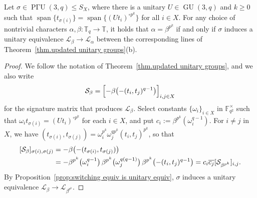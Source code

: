 \begin{lemma}
\label{lem: unitary equiv}
Let $\sigma \in \operatorname{P\text{$\Gamma$}U}(3,q) \leq S_X$, where there is a unitary $U \in \operatorname{GU}(3,q)$ and $k \geq 0$ such that $\operatorname{span}\{t_{\sigma(i)} \} = \operatorname{span}\{(Ut_i)^{\circ p^k}\}$ for all $i \in X$.
For any choice of nontrivial characters $\alpha,\beta \colon \mathbb{T}_q \to \mathbb{T}$, it holds that $\alpha = \beta^{p^k}$ if and only if $\sigma$ induces a unitary equivalence $\mathscr{L}_\beta \to \mathscr{L}_\alpha$ between the corresponding lines of Theorem~\ref{thm.updated unitary groups}(b).
\end{lemma}

\begin{proof}
We follow the notation of Theorem~\ref{thm.updated unitary groups}, and we also write 
\[
\mathcal{S}_\beta = \Bigl[ - \beta\bigl(-(t_i,t_j)^{q-1} \bigr) \Bigr]_{i,j \in X}
\] 
for the signature matrix that produces $\mathscr{L}_\beta$.
Select constants $\{ \omega_i \}_{i\in X}$ in $\mathbb{F}_{q^2}^\times$ such that $\omega_i t_{\sigma(i)} = (U t_i)^{\circ p^k}$ for each $i \in X$, and put $c_i := \beta^{p^k}(\omega_i^{q-1})$.
For $i\neq j$ in $X$, we have $(t_{\sigma(i)}, t_{\sigma(j)}) = \omega_i^{p^k} \omega_j^{q p^k} (t_i, t_j)^{p^k}$, so that
\begin{align}
\label{eq: unitary equiv 1}
[\mathcal{S}_\beta]_{\sigma(i), \sigma(j)}
&= -\beta \bigl( - (t_{\sigma(i)}, t_{\sigma(j)} ) \bigr) \\ \notag
&= - \beta^{p^k}\bigl( \omega_i^{q-1} \bigr) \, \beta^{p^k}\bigl( \omega_j^{q(q-1)} \bigr) \, \beta^{p^k}\bigl( -(t_i,t_j)^{q-1} \bigr)
= c_i \overline{c_j} [ \mathcal{S}_{\beta^{p^k}} ]_{i,j}.
\end{align}
By Proposition~\ref{prop:switching equiv is unitary equiv}, $\sigma$ induces a unitary equivalence $\mathscr{L}_\beta \to \mathscr{L}_{\beta^{p^k}}$.


\end{proof}
